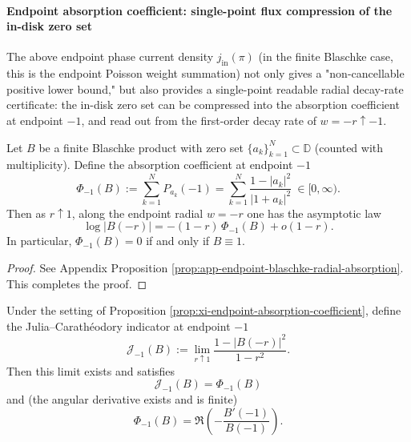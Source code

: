 \paragraph{Endpoint absorption coefficient: single-point flux compression of the in-disk zero set}
The above endpoint phase current density \(j_{\mathrm{in}}(\pi)\) (in the finite Blaschke case, this is the endpoint Poisson weight summation) not only gives a "non-cancellable positive lower bound," but also provides a single-point readable radial decay-rate certificate: the in-disk zero set can be compressed into the absorption coefficient at endpoint \(-1\), and read out from the first-order decay rate of \(w=-r\uparrow-1\).

\begin{proposition}\label{prop:xi-endpoint-absorption-coefficient}
Let \(B\) be a finite Blaschke product with zero set \(\{a_k\}_{k=1}^{N}\subset\mathbb{D}\) (counted with multiplicity).
Define the absorption coefficient at endpoint \(-1\)
\[
\Phi_{-1}(B):=\sum_{k=1}^{N}P_{a_k}(-1)=\sum_{k=1}^{N}\frac{1-|a_k|^2}{|1+a_k|^2}\ \in[0,\infty).
\]
Then as \(r\uparrow 1\), along the endpoint radial \(w=-r\) one has the asymptotic law
\[
\log|B(-r)|=-(1-r)\,\Phi_{-1}(B)+o(1-r).
\]
In particular, \(\Phi_{-1}(B)=0\) if and only if \(B\equiv 1\).
\end{proposition}

\begin{proof}
See Appendix Proposition \ref{prop:app-endpoint-blaschke-radial-absorption}. This completes the proof.
\end{proof}

\begin{theorem}\label{thm:xi-endpoint-julia-indicator-equals-absorption}
Under the setting of Proposition \ref{prop:xi-endpoint-absorption-coefficient}, define the Julia--Carath\'eodory indicator at endpoint \(-1\)
\[
\mathcal{J}_{-1}(B):=\lim_{r\uparrow 1}\frac{1-|B(-r)|^2}{1-r^2}.
\]
Then this limit exists and satisfies
\[
\boxed{\;\mathcal{J}_{-1}(B)=\Phi_{-1}(B)\;}
\]
and (the angular derivative exists and is finite)
\[
\boxed{\;\Phi_{-1}(B)=\Re\!\left(-\frac{B'(-1)}{B(-1)}\right).\;}
\]
\end{theorem}

